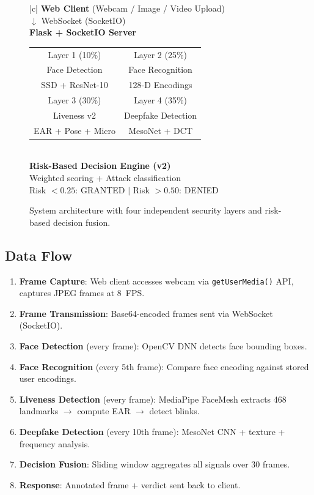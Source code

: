 \documentclass[conference,10pt]{IEEEtran}
\begin{document}
\begin{figure}[H]
\centering
\small
\begin{tabular}{|c|}
\hline
\textbf{Web Client} (Webcam / Image / Video Upload) \\
$\downarrow$ WebSocket (SocketIO) \\
\hline
\textbf{Flask + SocketIO Server} \\
\hline
\begin{tabular}{cc}
Layer 1 (10\%) & Layer 2 (25\%) \\
Face Detection & Face Recognition \\
SSD + ResNet-10 & 128-D Encodings \\
\hline
Layer 3 (30\%) & Layer 4 (35\%) \\
Liveness v2 & Deepfake Detection \\
EAR + Pose + Micro & MesoNet + DCT \\
\end{tabular} \\
\hline
\textbf{Risk-Based Decision Engine (v2)} \\
Weighted scoring + Attack classification \\
\hline
Risk $< 0.25$: GRANTED $|$ Risk $> 0.50$: DENIED \\
\hline
\end{tabular}
\caption{System architecture with four independent security layers and risk-based decision fusion.}
\label{fig:architecture}
\end{figure}

\subsection{Data Flow}

\begin{enumerate}
    \item \textbf{Frame Capture}: Web client accesses webcam via \texttt{getUserMedia()} API, captures JPEG frames at 8~FPS.
    \item \textbf{Frame Transmission}: Base64-encoded frames sent via WebSocket (SocketIO).
    \item \textbf{Face Detection} (every frame): OpenCV DNN detects face bounding boxes.
    \item \textbf{Face Recognition} (every 5th frame): Compare face encoding against stored user encodings.
    \item \textbf{Liveness Detection} (every frame): MediaPipe FaceMesh extracts 468 landmarks $\rightarrow$ compute EAR $\rightarrow$ detect blinks.
    \item \textbf{Deepfake Detection} (every 10th frame): MesoNet CNN + texture + frequency analysis.
    \item \textbf{Decision Fusion}: Sliding window aggregates all signals over 30 frames.
    \item \textbf{Response}: Annotated frame + verdict sent back to client.
\end{enumerate}
\end{document}

